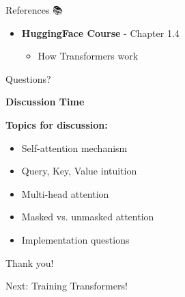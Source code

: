 \documentclass[aspectratio=169]{beamer}
\begin{document}
\begin{frame}[shrink=10]{References 📚}
\begin{itemize}
    \vspace{0.3em}

    \item \textbf{HuggingFace Course} - Chapter 1.4
    \begin{itemize}\setlength{\itemsep}{0pt}
        \item How Transformers work
    \end{itemize}
\end{itemize}
\end{frame}

\begin{frame}{Questions? 🙋}
\begin{center}
\LARGE
\textbf{Discussion Time}
\end{center}

\vspace{1em}

\textbf{Topics for discussion:}
\begin{itemize}\setlength{\itemsep}{0pt}
    \item Self-attention mechanism
    \item Query, Key, Value intuition
    \item Multi-head attention
    \item Masked vs. unmasked attention
    \item Implementation questions
\end{itemize}

\vspace{1em}

\begin{center}
\Large
Thank you! 🙏

\vspace{1em}

Next: Training Transformers!
\end{center}
\end{frame}
\end{document}
